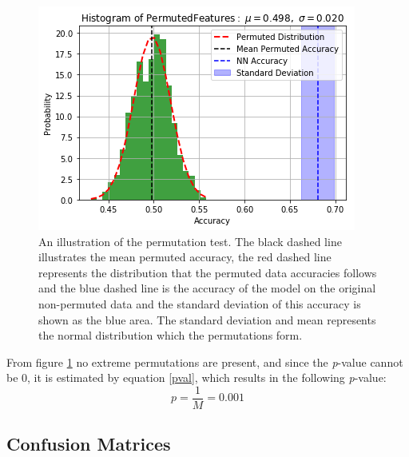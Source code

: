 \documentclass[11pt, fleqn, titlepage]{article}
\begin{document}
	\begin{figure}[H]
			\centering
			\includegraphics[width=0.5\linewidth]{imgs/perm_test.png}
		\caption{An illustration of the permutation test. The black dashed line illustrates the mean permuted accuracy, the red dashed line represents the distribution that the permuted data accuracies follows and the blue dashed line is the accuracy of the model on the original non-permuted data and the standard deviation of this accuracy is shown as the blue area. The standard deviation and mean represents the normal distribution which the permutations form. %
		}
		\label{fig:permtest}
	\end{figure}\noindent
	From figure \ref{fig:permtest} no extreme permutations are present, and since the \textit{p}-value cannot be 0, it is estimated by equation \ref{pval}, which results in the following \textit{p}-value:
	\[p=\frac{1}{M}=0.001\]
	
	\subsection{Confusion Matrices}\label{confusionMatrices}
	
\end{document}
